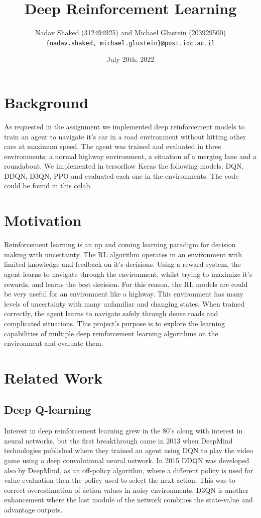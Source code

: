 \documentclass[leqno]{article}
\title{Deep Reinforcement Learning}
\author{Nadav Shaked (312494925) and Michael Glustein (203929500)\\\texttt{\{nadav.shaked, michael.glustein\}@post.idc.ac.il}}
\date{July 20th, 2022}
\begin{document}
\maketitle

\begin{multicols}{2}

\section{Background}
As requested in the assignment we implemented deep reinforcement models to train an agent to navigate it's car in a road environment without hitting other cars at maximum speed. The agent was trained and evaluated in three environments; a normal highway environment, a situation of a merging lane and a roundabout. We implemented in tersorflow Keras the following models; DQN, DDQN, D3QN, PPO and evaluated each one in the environments. 
The code could be found in this \href{https://colab.research.google.com/drive/1Awk9ir5vNH0lU9QfFHtts8kOa7n6V4tN?usp=sharing}{colab}.

\section{Motivation}
Reinforcement learning is an up and coming learning paradigm for decision making with uncertainty. The RL algorithm operates in an environment with limited knowledge and feedback on it's decisions. Using a reward system, the agent learns to navigate through the environment, whilst trying to maximize it's rewards, and learns the best decision. For this reason, the RL models are could be very useful for an environment like a highway. This environment has many levels of uncertainty with many unfamiliar and changing states. When trained correctly, the agent learns to navigate safely through dense roads and complicated situations. This project's purpose is to explore the learning capabilities of multiple deep reinforcement learning algorithms on the environment and evaluate them.

\section{Related Work}
\subsection{Deep Q-learning}
Interest in deep reinforcement learning grew in the 80's along with interest in neural networks, but the first breakthrough came in 2013 when DeepMind technologies published \cite{dqn} where they trained an agent using DQN to play the video game using a deep convolutional neural network. In 2015 DDQN \cite{ddqn} was developed also by DeepMind, as an off-policy algorithm, where a different policy is used for value evaluation then the policy used to select the next action. This was to correct overestimation of action values in noisy environments. D3QN \cite{d3qn} is another enhancement where the last module of the network combines the state-value and advantage outputs.


\end{multicols}
\end{document}
